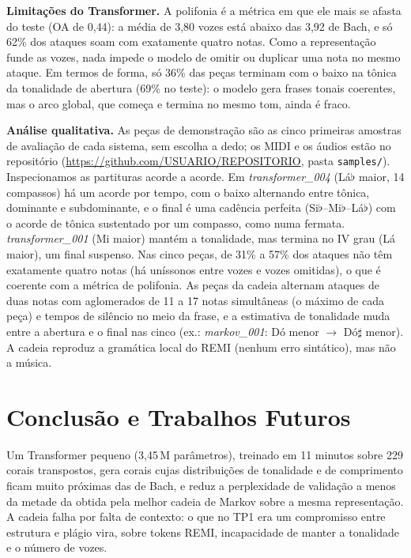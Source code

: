 \documentclass{article}
\begin{document}
\textbf{Limitações do Transformer.} A polifonia é a métrica em que ele mais se afasta do teste (OA de 0{,}44): a média de 3{,}80 vozes está abaixo das 3{,}92 de Bach, e só 62\% dos ataques soam com exatamente quatro notas. Como a representação funde as vozes, nada impede o modelo de omitir ou duplicar uma nota no mesmo ataque. Em termos de forma, só 36\% das peças terminam com o baixo na tônica da tonalidade de abertura (69\% no teste): o modelo gera frases tonais coerentes, mas o arco global, que começa e termina no mesmo tom, ainda é fraco.

\textbf{Análise qualitativa.} As peças de demonstração são as cinco primeiras amostras de avaliação de cada sistema, sem escolha a dedo; os MIDI e os áudios estão no repositório (\url{https://github.com/USUARIO/REPOSITORIO}, pasta \texttt{samples/}). Inspecionamos as partituras acorde a acorde. Em \textit{transformer\_004} (Lá$\flat$ maior, 14 compassos) há um acorde por tempo, com o baixo alternando entre tônica, dominante e subdominante, e o final é uma cadência perfeita (Si$\flat$--Mi$\flat$--Lá$\flat$) com o acorde de tônica sustentado por um compasso, como numa fermata. \textit{transformer\_001} (Mi maior) mantém a tonalidade, mas termina no IV grau (Lá maior), um final suspenso. Nas cinco peças, de 31\% a 57\% dos ataques não têm exatamente quatro notas (há uníssonos entre vozes e vozes omitidas), o que é coerente com a métrica de polifonia. As peças da cadeia alternam ataques de duas notas com aglomerados de 11 a 17 notas simultâneas (o máximo de cada peça) e tempos de silêncio no meio da frase, e a estimativa de tonalidade muda entre a abertura e o final nas cinco (ex.: \textit{markov\_001}: Dó menor $\to$ Dó$\sharp$ menor). A cadeia reproduz a gramática local do REMI (nenhum erro sintático), mas não a música.

\section{Conclusão e Trabalhos Futuros}\label{sec:conclusion}
Um Transformer pequeno (3{,}45\,M parâmetros), treinado em 11 minutos sobre 229 corais transpostos, gera corais cujas distribuições de tonalidade e de comprimento ficam muito próximas das de Bach, e reduz a perplexidade de validação a menos da metade da obtida pela melhor cadeia de Markov sobre a mesma representação. A cadeia falha por falta de contexto: o que no TP1 era um compromisso entre estrutura e plágio vira, sobre tokens REMI, incapacidade de manter a tonalidade e o número de vozes.
\end{document}
